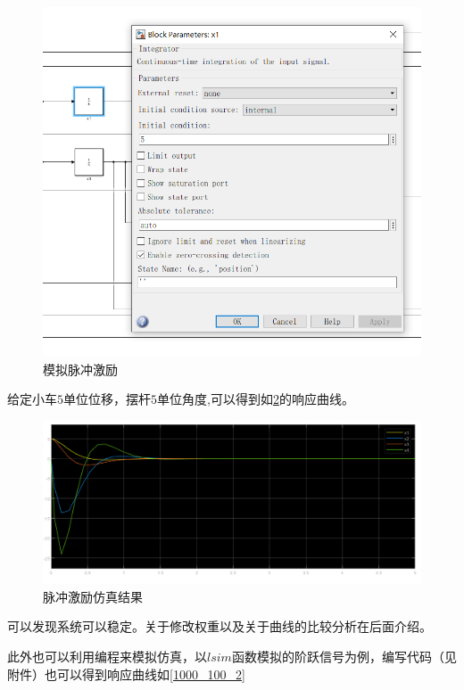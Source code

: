 \documentclass{MathorCupmodeling}
\begin{document}
\begin{figure}[hbpt]
\centering
\includegraphics[width=12cm]{initial.png}
\caption{模拟脉冲激励}\label{initial}
\end{figure}

给定小车$5$单位位移，摆杆$5$单位角度,可以得到如\cref{1000_100}的响应曲线。

\begin{figure}[hbpt]
\centering
\includegraphics[width=15cm]{1000_100.png}
\caption{脉冲激励仿真结果}\label{1000_100}
\end{figure}

可以发现系统可以稳定。关于修改权重以及关于曲线的比较分析在后面介绍。

此外也可以利用编程来模拟仿真，以$lsim$函数模拟的阶跃信号为例，编写代码（见附件）也可以得到响应曲线如\cref{1000_100_2}
\end{document}
